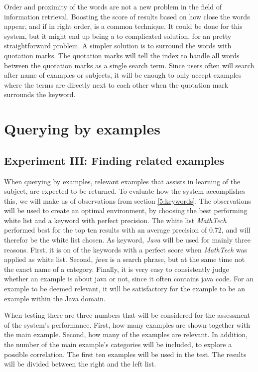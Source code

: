 Order and proximity of the words are not a new problem in the field of information retrieval. Boosting the score of results based on how close the words appear, and if in right order, is a common technique. It could be done for this system, but it might end up being a to complicated solution, for an pretty straightforward problem. A simpler solution is to surround the words with quotation marks. The quotation marks will tell the index to handle all words between the quotation marks as a single search term. Since users often will search after name of examples or subjects, it will be enough to only accept examples where the terms are directly next to each other when the quotation mark surrounds the keyword.


\section{Querying by examples} \label{5:queryByExample}

\subsection{Experiment III: Finding related examples}

When querying by examples, relevant examples that assists in learning of the subject, are expected to be returned. To evaluate how the system accomplishes this, we will make us of observations from section \ref{5:keywords}. The observations will be used to create an optimal environment, by choosing the best performing white list and a keyword with perfect precision. The white list \textit{MathTech} performed best for the top ten results with an average precision of 0.72, and will therefor be the white list chosen. As keyword, \textit{Java} will be used for mainly three reasons. First, it is on of the keywords with a perfect score when \textit{MathTech} was applied as white list. Second, \textit{java} is a search phrase, but at the same time not the exact name of a category. Finally, it is very easy to consistently judge whether an example is about java or not, since it often contains java code. For an example to be deemed relevant, it will be satisfactory for the example to be an example within the Java domain. 

When testing there are three numbers that will be considered for the assessment of the system's performance. First, how many examples are shown together with the main example. Second, how many of the examples are relevant. In addition, the number of the main example's categories will be included, to explore a possible correlation. The first ten examples will be used in the test. The results will be divided between the right and the left list.

